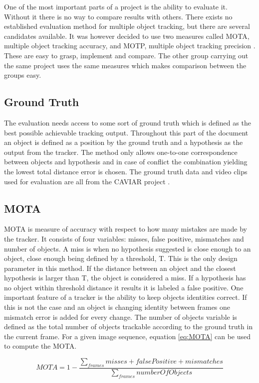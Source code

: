 One of the most important parts of a project is the ability to evaluate it. Without it there is no way to compare results with others. There exists no established evaluation method for multiple object tracking, but there are several candidates available. It was however decided to use two measures called MOTA, multiple object tracking accuracy, and MOTP, multiple object tracking precision \cite{MOTA}. These are easy to grasp, implement and compare. The other group carrying out the same project uses the same measures which makes comparison between the groups easy.

\subsection{Ground Truth}
The evaluation needs access to some sort of ground truth which is defined as the best possible achievable tracking output. Throughout this part of the document an object is defined as a position by the ground truth and a hypothesis as the output from the tracker. The method only allows one-to-one correspondence between objects and hypothesis and in case of conflict the combination yielding the lowest total distance error is chosen. The ground truth data and video clips used for evaluation are all from the CAVIAR project \cite{CAVIAR}.

\subsection{MOTA}
MOTA is measure of accuracy with respect to how many mistakes are made by the tracker. It consists of four variables: misses, false positive, mismatches and number of objects. A miss is when no hypothesis suggested is close enough to an object, close enough being defined by a threshold, T. This is the only design parameter in this method. If the distance between an object and the closest hypothesis is larger than T, the object is considered a miss. If a hypothesis has no object within threshold distance it results it is labeled a false positive. One important feature of a tracker is the ability to keep objects identities correct. If this is not the case and an object is changing identity between frames one mismatch error is added for every change. The number of objects variable is defined as the total number of objects trackable according to the ground truth in the current frame. For a given image sequence, equation \eqref{eq:MOTA} can be used to compute the MOTA.

\begin{equation}
\label{eq:MOTA}
MOTA = 1 - \frac{\sum_{frames}{misses + false Positive + mismatches}}{\sum_{frames}{number Of Objects}}
\end{equation}	

